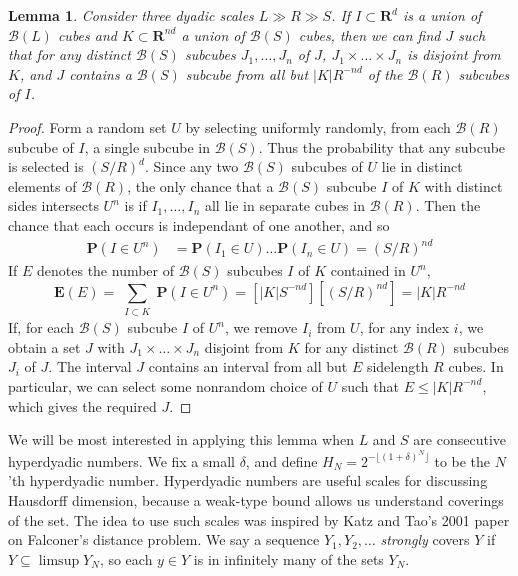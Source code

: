 \documentclass{article}
\theoremstyle{plain}
\newtheorem{lemma}{Lemma}
\theoremstyle{plain}
\begin{document}
\begin{lemma}
	Consider three dyadic scales $L \gg R \gg S$. If $I \subset \mathbf{R}^d$ is a union of $\mathcal{B}(L)$ cubes and $K \subset \mathbf{R}^{nd}$ a union of $\mathcal{B}(S)$ cubes, then we can find $J$ such that for any distinct $\mathcal{B}(S)$ subcubes $J_1, \dots, J_n$ of $J$, $J_1 \times \dots \times J_n$ is disjoint from $K$, and $J$ contains a $\mathcal{B}(S)$ subcube from all but $|K|R^{-nd}$ of the $\mathcal{B}(R)$ subcubes of $I$. 
\end{lemma}
\begin{proof}
	Form a random set $U$ by selecting uniformly randomly, from each $\mathcal{B}(R)$ subcube of $I$, a single subcube in $\mathcal{B}(S)$. Thus the probability that any subcube is selected is $(S/R)^d$. Since any two $\mathcal{B}(S)$ subcubes of $U$ lie in distinct elements of $\mathcal{B}(R)$, the only chance that a $\mathcal{B}(S)$ subcube $I$ of $K$ with distinct sides intersects $U^n$ is if $I_1, \dots, I_n$ all lie in separate cubes in $\mathcal{B}(R)$. Then the chance that each occurs is independant of one another, and so
	\begin{align*}
		\mathbf{P}(I \in U^n) &= \mathbf{P}(I_1 \in U) \dots \mathbf{P}(I_n \in U) = (S/R)^{nd}
	\end{align*}
	If $E$ denotes the number of $\mathcal{B}(S)$ subcubes $I$ of $K$ contained in $U^n$,
	\[ \mathbf{E}(E) = \sum_{\substack{I \subset K}} \mathbf{P}(I \in U^n) = [|K| S^{-nd}] [(S/R)^{nd}] = |K| R^{-nd} \]
	If, for each $\mathcal{B}(S)$ subcube $I$ of $U^n$, we remove $I_i$ from $U$, for any index $i$, we obtain a set $J$ with $J_1 \times \dots \times J_n$ disjoint from $K$ for any distinct $\mathcal{B}(R)$ subcubes $J_i$ of $J$. The interval $J$ contains an interval from all but $E$ sidelength $R$ cubes. In particular, we can select some nonrandom choice of $U$ such that $E \leq |K| R^{-nd}$, which gives the required $J$.
\end{proof}

We will be most interested in applying this lemma when $L$ and $S$ are consecutive hyperdyadic numbers. We fix a small $\delta$, and define $H_N = 2^{-\lfloor (1 + \delta)^N \rfloor}$ to be the $N$'th hyperdyadic number. Hyperdyadic numbers are useful scales for discussing Hausdorff dimension, because a weak-type bound allows us understand coverings of the set. The idea to use such scales was inspired by Katz and Tao's 2001 paper on Falconer's distance problem. We say a sequence $Y_1, Y_2, \dots$ {\it strongly} covers $Y$ if $Y \subseteq \limsup Y_N$, so each $y \in Y$ is in infinitely many of the sets $Y_N$.
\end{document}
